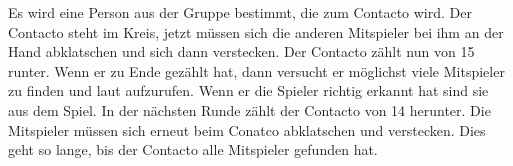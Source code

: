  Es wird eine Person aus der Gruppe bestimmt, die zum Contacto wird. Der Contacto steht im Kreis, jetzt müssen sich die anderen Mitspieler bei ihm an der Hand abklatschen und sich dann verstecken. Der Contacto zählt nun von 15 runter. Wenn er zu Ende gezählt hat, dann versucht er möglichst viele Mitspieler zu finden und laut aufzurufen. Wenn er die Spieler richtig erkannt hat sind sie aus dem Spiel. In der nächsten Runde zählt der Contacto von 14 herunter. Die Mitspieler müssen sich erneut beim Conatco abklatschen und verstecken. Dies geht so lange, bis der Contacto alle Mitspieler gefunden hat. 
 \\




